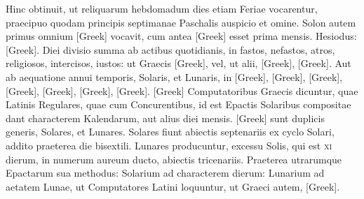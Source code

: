 Hinc obtinuit, ut reliquarum
hebdomadum dies etiam Feriae vocarentur, praecipuo quodam
principis septimanae Paschalis auspicio et omine.
Solon autem
primus omnium \textgreek{[Greek]} vocavit,
 cum antea \textgreek{[Greek]} esset
prima mensis.
Hesiodus: \textgreek{[Greek]}.
Diei divisio summa ab actibus quotidianis, in fastos, nefastos, atros,
religiosos, intercisos, iustos: ut Graecis
 \textgreek{[Greek]}, vel, ut alii,
\textgreek{[Greek]},
 \textgreek{[Greek]}.
Aut ab aequatione annui
temporis, Solaris, et Lunaris, in \textgreek{[Greek]},
 \textgreek{[Greek]}, \textgreek{[Greek]},
\textgreek{[Greek]}, \textgreek{[Greek]},
 \textgreek{[Greek]}, \textgreek{[Greek]}.
\textgreek{[Greek]} Computatoribus
Graecis dicuntur, quae Latinis Regulares, quae cum Concurentibus,
id est Epactis Solaribus compositae dant characterem Kalendarum,
aut alius diei mensis.
\textgreek{[Greek]} sunt duplicis generis, Solares, et
Lunares.
Solares fiunt abiectis septenariis ex cyclo Solari, addito praeterea
die bisextili.
Lunares producuntur, excessu Solis, qui est \textsc{xi} dierum,
in numerum aureum ducto, abiectis tricenariis.
Praeterea utrarumque
Epactarum sua methodus: Solarium ad characterem dierum:
Lunarium ad aetatem Lunae, ut Computatores Latini loquuntur, ut
Graeci autem, \textgreek{[Greek]}.


